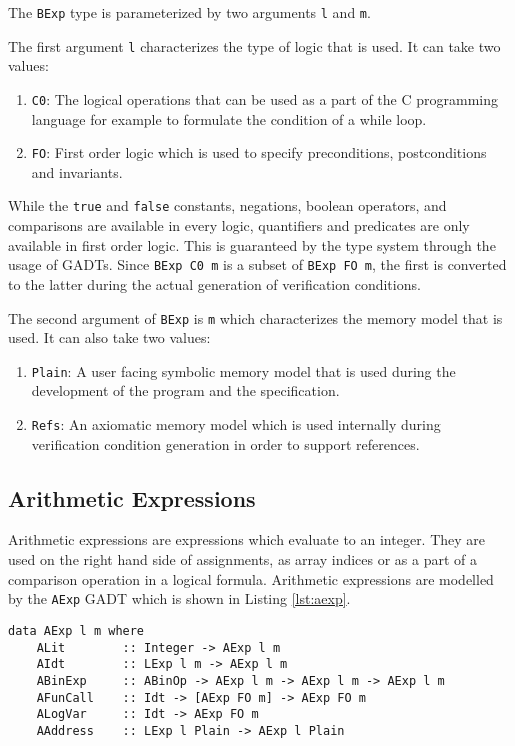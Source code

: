 \documentclass[12pt]{article}
\begin{document}
The \texttt{BExp} type is parameterized by two arguments \texttt{l} and \texttt{m}.

The first argument \texttt{l} characterizes the type of logic that is used.
It can take two values:
\begin{enumerate}
    \item \texttt{C0}: The logical operations that can be used as a part of the C programming language for example to formulate the condition of a while loop.
    \item \texttt{FO}: First order logic which is used to specify preconditions, postconditions and invariants.
\end{enumerate}
 
While the \texttt{true} and \texttt{false} constants, negations, boolean operators, and comparisons are available in every logic, quantifiers and predicates are only available in first order logic.
This is guaranteed by the type system through the usage of GADTs.
Since \texttt{BExp C0 m} is a subset of \texttt{BExp FO m}, the first is converted to the latter during the actual generation of verification conditions.

The second argument of \texttt{BExp} is \texttt{m} which characterizes the memory model that is used.
It can also take two values:
\begin{enumerate}
    \item \texttt{Plain}: A user facing symbolic memory model that is used during the development of the program and the specification.
    \item \texttt{Refs}: An axiomatic memory model which is used internally during verification condition generation in order to support references.
\end{enumerate}

\subsection{Arithmetic Expressions}

Arithmetic expressions are expressions which evaluate to an integer.
They are used on the right hand side of assignments, as array indices or as a part of a comparison operation in a logical formula.
Arithmetic expressions are modelled by the \texttt{AExp} GADT which is shown in Listing \ref{lst:aexp}.

\begin{lstlisting}[style=c0, caption=AExp, label=lst:aexp]
data AExp l m where
    ALit        :: Integer -> AExp l m
    AIdt        :: LExp l m -> AExp l m
    ABinExp     :: ABinOp -> AExp l m -> AExp l m -> AExp l m
    AFunCall    :: Idt -> [AExp FO m] -> AExp FO m
    ALogVar     :: Idt -> AExp FO m
    AAddress    :: LExp l Plain -> AExp l Plain
\end{lstlisting}
\end{document}
